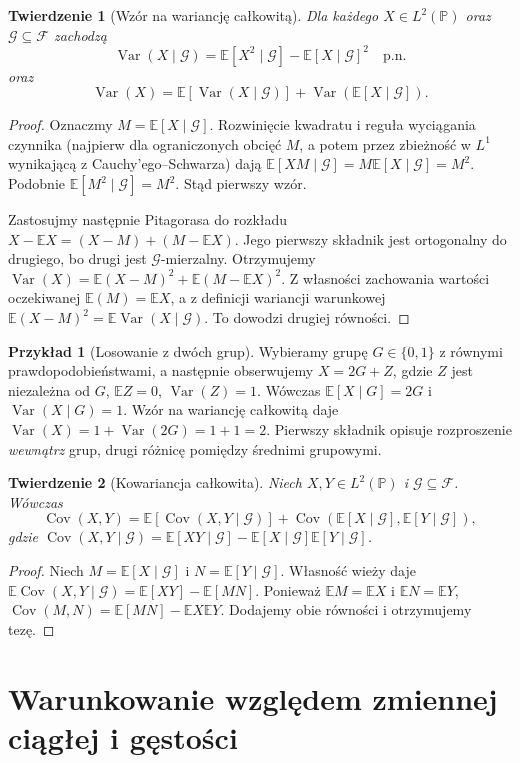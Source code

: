 \documentclass[11pt,a4paper,oneside]{report}
\numberwithin{equation}{chapter}
\theoremstyle{plain}
\newtheorem{twierdzenie}{Twierdzenie}[chapter]
\theoremstyle{definition}
\newtheorem{przyklad}{Przykład}[chapter]
\theoremstyle{remark}
\newcommand{\Prob}{\mathbb{P}}
\newcommand{\E}{\mathbb{E}}
\newcommand{\Var}{\operatorname{Var}}
\newcommand{\Cov}{\operatorname{Cov}}
\begin{document}
\begin{twierdzenie}[Wzór na wariancję całkowitą]
Dla każdego $X\in L^2(\Prob)$ oraz
$\mathcal G\subseteq\mathcal F$ zachodzą
\[
\Var(X\mid\mathcal G)=
\E[X^2\mid\mathcal G]-\E[X\mid\mathcal G]^2
\quad\text{p.n.}
\]
oraz
\[
\Var(X)=\E[\Var(X\mid\mathcal G)]
+\Var(\E[X\mid\mathcal G]).
\]
\end{twierdzenie}
\begin{proof}
Oznaczmy $M=\E[X\mid\mathcal G]$.
Rozwinięcie kwadratu i reguła wyciągania
czynnika (najpierw dla ograniczonych obcięć $M$,
a potem przez zbieżność w $L^1$ wynikającą
z Cauchy'ego--Schwarza) dają
$\E[X M\mid\mathcal G]=M\E[X\mid\mathcal G]=M^2$.
Podobnie $\E[M^2\mid\mathcal G]=M^2$.
Stąd pierwszy wzór.

Zastosujmy następnie Pitagorasa do rozkładu
$X-\E X=(X-M)+(M-\E X)$.
Jego pierwszy składnik jest ortogonalny do
drugiego, bo drugi jest $\mathcal G$-mierzalny.
Otrzymujemy
$\Var(X)=\E(X-M)^2+\E(M-\E X)^2$.
Z własności zachowania wartości oczekiwanej
$\E(M)=\E X$, a z definicji wariancji
warunkowej $\E(X-M)^2=\E\Var(X\mid\mathcal G)$.
To dowodzi drugiej równości.
\end{proof}

\begin{przyklad}[Losowanie z dwóch grup]
Wybieramy grupę $G\in\{0,1\}$ z równymi
prawdopodobieństwami, a następnie obserwujemy
$X=2G+Z$, gdzie $Z$ jest niezależna od $G$,
$\E Z=0$, $\Var(Z)=1$. Wówczas
$\E[X\mid G]=2G$ i
$\Var(X\mid G)=1$. Wzór na wariancję całkowitą
daje $\Var(X)=1+\Var(2G)=1+1=2$.
Pierwszy składnik opisuje rozproszenie \emph{wewnątrz}
grup, drugi różnicę pomiędzy średnimi grupowymi.
\end{przyklad}

\begin{twierdzenie}[Kowariancja całkowita]
Niech $X,Y\in L^2(\Prob)$ i
$\mathcal G\subseteq\mathcal F$. Wówczas
\[
\Cov(X,Y)=\E[\Cov(X,Y\mid\mathcal G)]
+\Cov(\E[X\mid\mathcal G],\E[Y\mid\mathcal G]),
\]
gdzie
$\Cov(X,Y\mid\mathcal G)=
\E[XY\mid\mathcal G]-
\E[X\mid\mathcal G]\E[Y\mid\mathcal G]$.
\end{twierdzenie}
\begin{proof}
Niech $M=\E[X\mid\mathcal G]$ i
$N=\E[Y\mid\mathcal G]$. Własność wieży daje
$\E\Cov(X,Y\mid\mathcal G)=\E[XY]-\E[MN]$.
Ponieważ $\E M=\E X$ i $\E N=\E Y$,
$\Cov(M,N)=\E[MN]-\E X\E Y$.
Dodajemy obie równości i otrzymujemy tezę.
\end{proof}

\section{Warunkowanie względem zmiennej ciągłej i gęstości}
\end{document}

